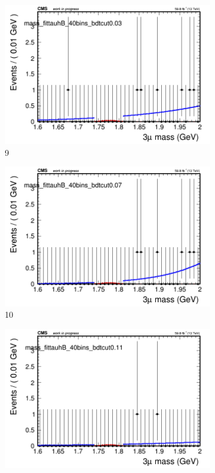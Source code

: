 \begin{figure}[h!]
\begin{subfigure}{0.2\textwidth}
        \includegraphics[width=\textwidth]{power_law/plots/tauhB/massfit_tauhB_40bins_bdtcut0.03.png}
        \caption{9}
    \end{subfigure}
    \begin{subfigure}{0.2\textwidth}
        \includegraphics[width=\textwidth]{power_law/plots/tauhB/massfit_tauhB_40bins_bdtcut0.07.png}
        \caption{10}
    \end{subfigure}
    \begin{subfigure}{0.2\textwidth}
        \includegraphics[width=\textwidth]{power_law/plots/tauhB/massfit_tauhB_40bins_bdtcut0.11.png}

\end{subfigure}
\end{figure}
